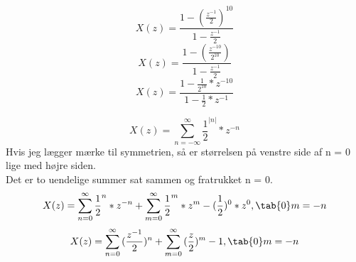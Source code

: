\begin{Opgaver}
\begin{kapitel}[Z transformation]
\begin{Opgave}
\begin{UnderOpgave}[\text{$x[n] = (\frac{1}{2})^n * (u[n] - u[n - 10])$}]
                \[X(z) = \frac{1 - (\frac{z^{-1}}{2})^{10}}{1 - \frac{z^{-1}}{2}}\]
                \[X(z) = \frac{1 - (\frac{z^{-10}}{2^{10}})}{1 - \frac{z^{-1}}{2}}\]
                \[X(z) = \frac{1 - \frac{1}{2^{10}}*z^{-10}}{1 - \frac{1}{2}*z^{-1}}\]
            \end{UnderOpgave}\vspace{20pt}
            \begin{UnderOpgave}[\text{$x[n] = \frac{1}{2}^{|n|}$}]
                \[X(z) = \sum_{n=-\infty}^{\infty}{\frac{1}{2}^{|n|} * z^{-n}}\]
                Hvis jeg lægger mærke til symmetrien, så er størrelsen på venstre side af n = 0 lige med højre siden. \\
                Det er to uendelige summer sat sammen og fratrukket n = 0.\\ 

                \[X(z) = \sum_{n=0}^{\infty}{\frac{1}{2}^n * z^{-n}} + \sum_{m=0}^{\infty}{\frac{1}{2}^m * z^{m}} - (\frac{1}{2})^0 * z^0, \tab{0} m = -n\]
                \[X(z) = \sum_{n=0}^{\infty}{(\frac{z^{-1}}{2})^n} + \sum_{m=0}^{\infty}{(\frac{z}{2})^m} - 1, \tab{0} m = -n\]
                

\end{UnderOpgave}
\end{Opgave}
\end{kapitel}
\end{Opgaver}
